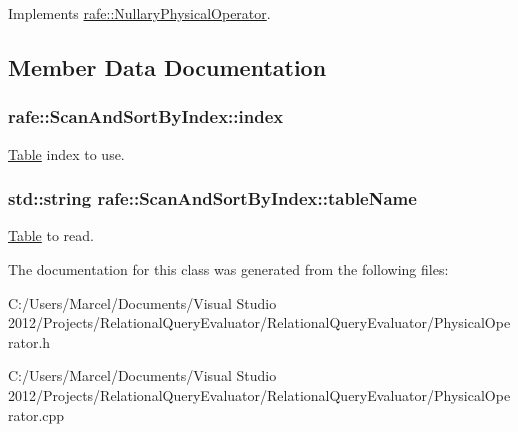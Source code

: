 Implements \hyperlink{classrafe_1_1_nullary_physical_operator_a0810fc4b368521ebe847fa48fcdcf948}{rafe\+::\+Nullary\+Physical\+Operator}.



\subsection{Member Data Documentation}
\hypertarget{classrafe_1_1_scan_and_sort_by_index_a098de983bcb2456f2b904bea0dbd2bb8}{
\subsubsection[{index}]{ rafe\+::\+Scan\+And\+Sort\+By\+Index\+::index}}\label{classrafe_1_1_scan_and_sort_by_index_a098de983bcb2456f2b904bea0dbd2bb8}
\hyperlink{classrafe_1_1_table}{Table} index to use. \hypertarget{classrafe_1_1_scan_and_sort_by_index_abdcff33645fc0806646167276cc3c46f}{
\subsubsection[{table\+Name}]{\setlength{\rightskip}{0pt plus 5cm}std\+::string rafe\+::\+Scan\+And\+Sort\+By\+Index\+::table\+Name}}\label{classrafe_1_1_scan_and_sort_by_index_abdcff33645fc0806646167276cc3c46f}
\hyperlink{classrafe_1_1_table}{Table} to read. 

The documentation for this class was generated from the following files\+:\begin{DoxyCompactItemize}
\item 
C\+:/\+Users/\+Marcel/\+Documents/\+Visual Studio 2012/\+Projects/\+Relational\+Query\+Evaluator/\+Relational\+Query\+Evaluator/Physical\+Operator.\+h\item 
C\+:/\+Users/\+Marcel/\+Documents/\+Visual Studio 2012/\+Projects/\+Relational\+Query\+Evaluator/\+Relational\+Query\+Evaluator/Physical\+Operator.\+cpp\end{DoxyCompactItemize}
